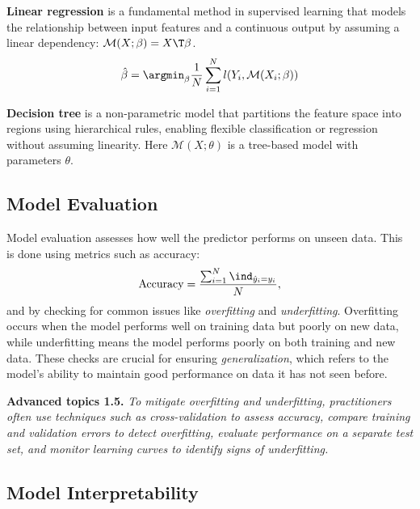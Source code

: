 \begin{example}
\textbf{Linear regression} is a fundamental method in supervised
learning that models the relationship between input features and a continuous
output by assuming a linear dependency: $\mathcal{M}(X; \beta) = X\T \beta$.
\[
\hat{\beta} = \argmin_{\beta} \frac{1}{N} \sum_{i=1}^{N} l(Y_i, \mathcal{M}(X_i; \beta))
\]
\end{example}

\begin{example}
\textbf{Decision tree} is a non-parametric model that partitions the
feature space into regions using hierarchical rules, enabling flexible classification
or regression without assuming linearity. Here $\mathcal{M}(X; \theta)$ is a tree-based
model with parameters $\theta$.
\end{example}

\subsection{Model Evaluation}
\label{sec:ch1-evaluation}

Model evaluation assesses how well the predictor performs on unseen data.
This is done using metrics such as accuracy:
\begin{equation}\label{eq:ch1-accuracy}
\text{Accuracy} = \frac{\sum_{i=1}^{N} \ind_{\hat{y}_i = y_i}}{N},
\end{equation}
and by checking for common issues like \emph{overfitting} and \emph{underfitting}. Overfitting
occurs when the model performs well on training data but poorly on new
data, while underfitting means the model performs poorly on both training and new
data. These checks are crucial for ensuring \emph{generalization}, which refers to the
model's ability to maintain good performance on data it has not seen before.

\begin{tcolorbox}[advancedbox]
\textbf{Advanced topics 1.5.} \textit{To mitigate overfitting and underfitting, practitioners
often use techniques such as cross-validation to assess accuracy,
compare training and validation errors to detect overfitting, evaluate
performance on a separate test set, and monitor learning curves to
identify signs of underfitting.}
\end{tcolorbox}

\subsection{Model Interpretability}
\label{sec:ch1-interpretability}


